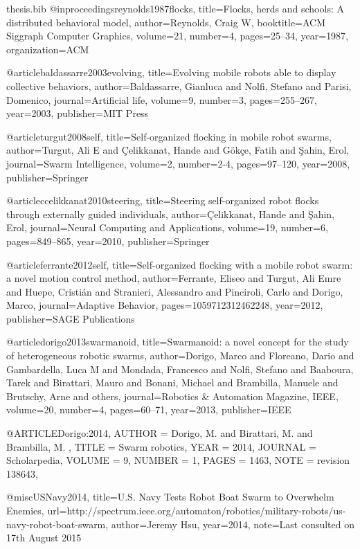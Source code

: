 \documentclass[oneside, a4paper, 12pt]{memoir}
\begin{document}
\begin{filecontents}{thesis.bib}
@inproceedings{reynolds1987flocks,
  title={Flocks, herds and schools: A distributed behavioral model},
  author={Reynolds, Craig W},
  booktitle={ACM Siggraph Computer Graphics},
  volume={21},
  number={4},
  pages={25--34},
  year={1987},
  organization={ACM}
}

@article{baldassarre2003evolving,
  title={Evolving mobile robots able to display collective behaviors},
  author={Baldassarre, Gianluca and Nolfi, Stefano and Parisi, Domenico},
  journal={Artificial life},
  volume={9},
  number={3},
  pages={255--267},
  year={2003},
  publisher={MIT Press}
}

@article{turgut2008self,
  title={Self-organized flocking in mobile robot swarms},
  author={Turgut, Ali E and {\c{C}}elikkanat, Hande and G{\"o}k{\c{c}}e, Fatih and {\c{S}}ahin, Erol},
  journal={Swarm Intelligence},
  volume={2},
  number={2-4},
  pages={97--120},
  year={2008},
  publisher={Springer}
}

@article{ccelikkanat2010steering,
  title={Steering self-organized robot flocks through externally guided individuals},
  author={{\c{C}}elikkanat, Hande and {\c{S}}ahin, Erol},
  journal={Neural Computing and Applications},
  volume={19},
  number={6},
  pages={849--865},
  year={2010},
  publisher={Springer}
}

@article{ferrante2012self,
  title={Self-organized flocking with a mobile robot swarm: a novel motion control method},
  author={Ferrante, Eliseo and Turgut, Ali Emre and Huepe, Cristi{\'a}n and Stranieri, Alessandro and Pinciroli, Carlo and Dorigo, Marco},
  journal={Adaptive Behavior},
  pages={1059712312462248},
  year={2012},
  publisher={SAGE Publications}
}

@article{dorigo2013swarmanoid,
  title={Swarmanoid: a novel concept for the study of heterogeneous robotic swarms},
  author={Dorigo, Marco and Floreano, Dario and Gambardella, Luca M and Mondada, Francesco and Nolfi, Stefano and Baaboura, Tarek and Birattari, Mauro and Bonani, Michael and Brambilla, Manuele and Brutschy, Arne and others},
  journal={Robotics \& Automation Magazine, IEEE},
  volume={20},
  number={4},
  pages={60--71},
  year={2013},
  publisher={IEEE}
}

@ARTICLE{Dorigo:2014,
AUTHOR = {Dorigo, M.  and Birattari, M.  and Brambilla, M. },
TITLE   = {{S}warm robotics},
YEAR	= 2014,
JOURNAL	= Scholarpedia,
VOLUME  = 9,
NUMBER  = 1,
PAGES   = 1463,
NOTE   = {{revision 138643}},
}

@misc{USNavy2014,
	title={U.S. Navy Tests Robot Boat Swarm to Overwhelm Enemies},
	url={http://spectrum.ieee.org/automaton/robotics/military-robots/us-navy-robot-boat-swarm},
	author={Jeremy Hsu},
	year={2014},
	note={Last consulted on 17th August 2015}
}


\end{filecontents}
\end{document}

